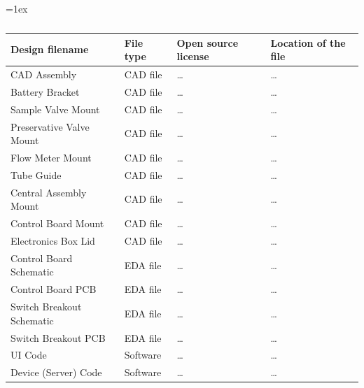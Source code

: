 \documentclass[11pt, letterpaper]{article}
\begin{document}



%
%

\begin{table}[H]
\vskip 0.1cm
\tabulinesep=1ex
\begin{tabu} to \linewidth {|X[l]|X[l]|X[1.5,1,l]|X[1.5,1,l]|} 
	\hline
	\textbf{Design filename} & \textbf{File type} & \textbf{Open source license} & \textbf{Location of the file} \\\hline
	
	CAD Assembly 				& CAD file & \dots & \dots \\\hline
	Battery Bracket 			& CAD file & \dots & \dots \\\hline
	Sample Valve Mount 			& CAD file & \dots & \dots \\\hline
	Preservative Valve Mount 	& CAD file & \dots & \dots \\\hline
	Flow Meter Mount 			& CAD file & \dots & \dots \\\hline
	Tube Guide 					& CAD file & \dots & \dots \\\hline
	Central Assembly Mount		& CAD file & \dots & \dots \\\hline
	Control Board Mount 		& CAD file & \dots & \dots \\\hline
	Electronics Box Lid			& CAD file & \dots & \dots \\\hline %
	Control Board Schematic		& EDA file & \dots & \dots \\\hline
	Control Board PCB			& EDA file & \dots & \dots \\\hline
	Switch Breakout Schematic	& EDA file & \dots & \dots \\\hline
	Switch Breakout PCB			& EDA file & \dots & \dots \\\hline
	UI Code 					& Software & \dots & \dots \\\hline
	Device (Server) Code 		& Software & \dots & \dots \\\hline
\end{tabu}
\caption{}
\end{table}
\end{document}
